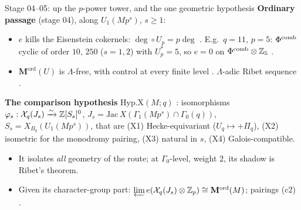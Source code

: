 \begin{frame}{Stage 04--05: up the $p$-power tower, and the one geometric hypothesis}
  \small
  \textbf{Ordinary passage} (stage 04), along $U_1(Mp^s)$, $s\ge1$:
  \begin{itemize}\setlength{\itemsep}{2pt}
    \item $e$ kills the Eisenstein cokernels: $\deg\circ U_p=p\deg$ . E.g.\ $q=11$, $p=5$:
      $\Phi^{\mathrm{comb}}$ cyclic of order $10$, $250$ ($s=1,2$) with $U_p^*=5$, so $e=0$ on $\Phi^{\mathrm{comb}}\otimes\mathbb{Z}_5$ .
    \item $\mathbf M^{\mathrm{ord}}(U)$ is $\Lambda$-free, with control at every finite level .
      $\Lambda$-adic Ribet sequence .
  \end{itemize}
  \textbf{The comparison hypothesis} $\mathrm{Hyp.X}(M;q)$ :
  isomorphisms $\varphi_s:\mathcal X_q(J_s)\xrightarrow{\sim}\mathbb{Z}[S_s]^0$, $J_s=\mathrm{Jac}\,X(\Gamma_1(Mp^s)\cap\Gamma_0(q))$, $S_s=X_{B_q}(U_1(Mp^s))$,
  that are (X1) Hecke-equivariant ($U_q\mapsto+\Pi_q$), (X2) isometric for the monodromy pairing, (X3) natural in $s$, (X4) Galois-compatible.
  \begin{itemize}\setlength{\itemsep}{1pt}
    \item It isolates \emph{all} geometry of the route; at $\Gamma_0$-level, weight $2$, its shadow is Ribet's theorem.
    \item Given its character-group part: $\varprojlim e(\mathcal X_q(J_s)\otimes\mathbb{Z}_p)\cong\mathbf M^{\mathrm{ord}}(M)$; pairings (c2) .
  \end{itemize}
\end{frame}
